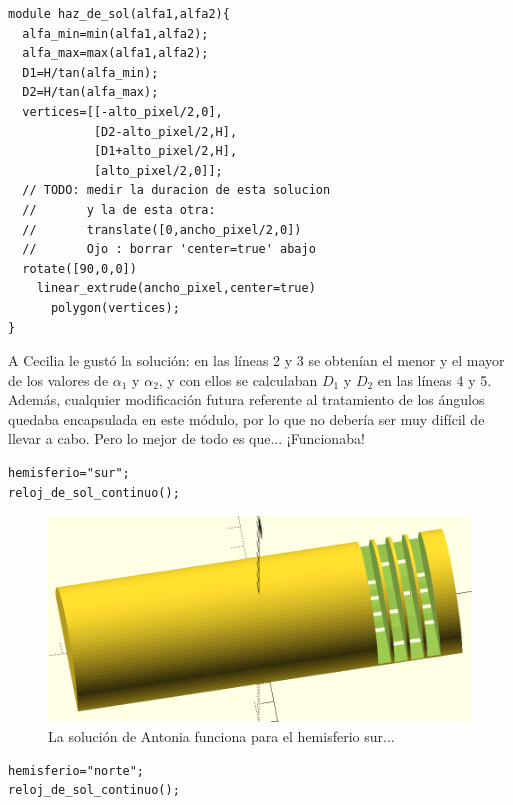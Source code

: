 \begin{lstlisting}
module haz_de_sol(alfa1,alfa2){
  alfa_min=min(alfa1,alfa2);
  alfa_max=max(alfa1,alfa2);
  D1=H/tan(alfa_min);
  D2=H/tan(alfa_max);
  vertices=[[-alto_pixel/2,0],
            [D2-alto_pixel/2,H],
            [D1+alto_pixel/2,H],
            [alto_pixel/2,0]];
  // TODO: medir la duracion de esta solucion
  //       y la de esta otra:
  //       translate([0,ancho_pixel/2,0])
  //       Ojo : borrar 'center=true' abajo
  rotate([90,0,0])
    linear_extrude(ancho_pixel,center=true)
      polygon(vertices);
}\end{lstlisting}%

A Cecilia le gustó la solución: en las líneas 2 y 3 se obtenían el
menor y el mayor de los valores de $\alpha_1$ y $\alpha_2$, y con
ellos se calculaban $D_1$ y $D_2$ en las líneas 4 y 5. Además,
cualquier modificación futura referente al tratamiento de los ángulos
quedaba encapsulada en este módulo, por lo que no debería ser muy
difícil de llevar a cabo. Pero lo mejor de todo es que... ¡Funcionaba!

\begin{lstlisting}
hemisferio="sur";
reloj_de_sol_continuo();
\end{lstlisting}%

\begin{figure}[ht]
  \centering
  \includegraphics[width=.85\textwidth]{imagenes/unidades-minutos}
  \caption{La solución de Antonia funciona para el hemisferio sur...}
  \label{fig:unidades-sur}
\end{figure}

\begin{lstlisting}
hemisferio="norte";
reloj_de_sol_continuo();
\end{lstlisting}%

